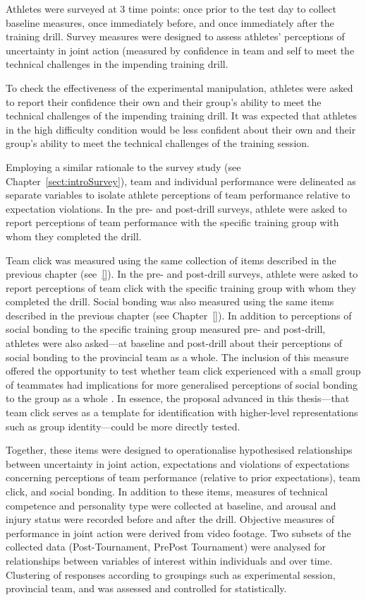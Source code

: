 \begin{CJK}{UTF8}{gbsn}
Athletes were surveyed at 3 time points: once prior to the test day to collect baseline measures, once immediately before, and once immediately after the training drill.  Survey measures were designed to assess athletes’ perceptions of uncertainty in joint action (measured by confidence in team and self to meet the technical challenges in the impending training drill.

To check the effectiveness of the experimental manipulation, athletes were asked to report their confidence their own and their group's ability to meet the technical challenges of the impending training drill.  It was expected that athletes in the high difficulty condition would be less confident about their own and their group's ability to meet the technical challenges of the training session.

Employing a similar rationale to the survey study (see Chapter~\ref{sect:introSurvey}), team and individual performance were delineated as separate variables   to isolate athlete perceptions of team performance relative to expectation violations.  In the pre- and post-drill surveys, athlete were asked to report perceptions of team performance with the specific training group with whom they completed the drill.

Team click was measured using the same collection of items described in the previous chapter (see~\ref{}).  In the pre- and post-drill surveys, athlete were asked to report perceptions of team click with the specific training group with whom they completed the drill.  Social bonding was also measured using the same items described in the previous chapter (see Chapter~\ref{}).  In addition to perceptions of social bonding to the specific training group measured pre- and post-drill, athletes were also asked—at baseline and post-drill about their perceptions of social bonding to the provincial team as a whole.  The inclusion of this measure offered the opportunity to test whether team click experienced with a small group of teammates had implications for more generalised perceptions of social bonding to the group as a whole \citep[see, for example][]{Reddish2013a,Swann2010}.  In essence, the proposal advanced in this thesis---that team click serves as a template for identification with higher-level representations such as group identity---could be more directly tested.

Together, these items were designed to operationalise hypothesised relationships between uncertainty in joint action, expectations and violations of expectations concerning perceptions of team performance (relative to prior expectations), team click, and social bonding.  In addition to these items, measures of technical competence and personality type were collected at baseline, and arousal and injury status were recorded before and after the drill.  Objective measures of performance in joint action were derived from video footage.  Two subsets of the collected data (Post-Tournament, PrePost Tournament) were analysed for relationships between variables of interest within individuals and over time.  Clustering of responses according to groupings such as experimental session, provincial team, and was assessed and controlled for statistically.


\end{CJK}
